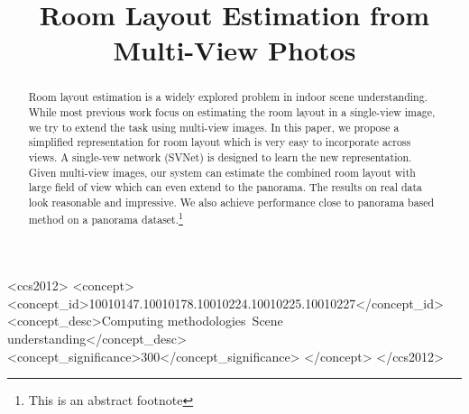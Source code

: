 \documentclass[sigconf]{acmart}
\newcommand{\comments}[1]{}
\begin{document}
\title{Room Layout Estimation from Multi-View Photos}

\comments{
\author{Ruifeng Deng}
\orcid{1234-5678-9012}
\affiliation{%
  \institution{University of Science and Technology of China}
  \streetaddress{P.O. Box 1212}
  \city{Hefei}
  \country{China}
  \postcode{43017-6221}
}
\email{trovato@corporation.com}

\author{Chaoyu Xie}
\affiliation{%
  \institution{University of Science and Technology of China}
  \streetaddress{P.O. Box 1212}
  \city{Hefei}
  \country{China}
  \postcode{43017-6221}
}
\email{webmaster@marysville-ohio.com}

\author{Xuejin Chen}
\affiliation{%
  \institution{University of Science and Technology of China}
  \streetaddress{1 Th{\o}rv{\"a}ld Circle}
  \city{Hefei}
  \country{China}}
\email{larst@affiliation.org}


\renewcommand{\shortauthors}{B. Trovato et al.}
}

\begin{abstract}
Room layout estimation is a widely explored problem in indoor scene understanding. While most previous work focus on estimating the room layout in a single-view image, we try to extend the task using multi-view images. In this paper, we propose a simplified representation for room layout which is very easy to incorporate across views. A single-vew network (SVNet) is designed to learn the new representation. Given multi-view images, our system can estimate the combined room layout with large field of view which can even extend to the panorama. The results on real data look reasonable and impressive. We also achieve performance close to panorama based method on a panorama dataset.\footnote{This is an abstract footnote}
\end{abstract}

%
%
\begin{CCSXML}
	<ccs2012>
	<concept>
	<concept_id>10010147.10010178.10010224.10010225.10010227</concept_id>
	<concept_desc>Computing methodologies~Scene understanding</concept_desc>
	<concept_significance>300</concept_significance>
	</concept>
	</ccs2012>
\end{CCSXML}
\end{document}
